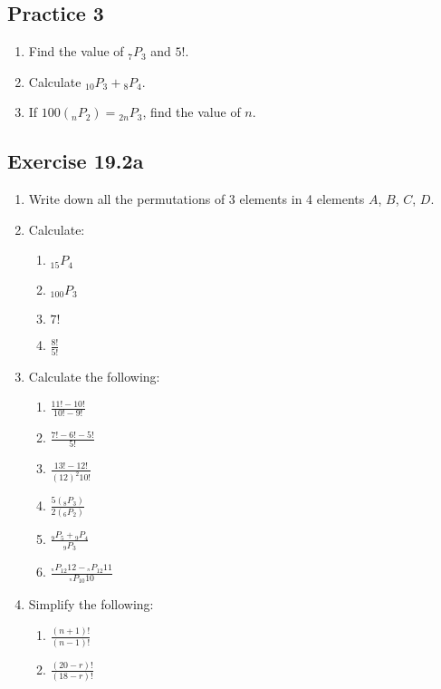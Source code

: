 \documentclass{report}
\newcommand\permtwo[2][^n]{{}_{#1}P_{#2}}
\begin{document}
\begin{multicols}{2}
  \subsection{Practice 3}

  \begin{enumerate}
    \item Find the value of $\permtwo[7]{3}$ and $5!$.
    \item Calculate $\permtwo[10]{3} + \permtwo[8]{4}$.
    \item If $100(\permtwo[n]{2}) = \permtwo[2n]{3}$, find the value of $n$.
  \end{enumerate}

  \subsection{Exercise 19.2a}

  \begin{enumerate}
    \item Write down all the permutations of 3 elements in 4 elements $A$, $B$, $C$, $D$.

    \item Calculate:
          \begin{enumerate}
            \item $\permtwo[15]{4}$
            \item $\permtwo[100]{3}$
            \item $7!$
            \item $\frac{8!}{5!}$
          \end{enumerate}

    \item Calculate the following:
          \begin{enumerate}
            \item $\frac{11! - 10!}{10! - 9!}$
            \item $\frac{7! - 6! - 5!}{5!}$
            \item $\frac{13! - 12!}{{(12)}^2 10!}$
            \item $\frac{5(\permtwo[8]{3})}{2(\permtwo[6]{2})}$
            \item $\frac{\permtwo[9]{5} + \permtwo[9]{4}}{\permtwo[9]{3}}$
            \item $\frac{\permtwo{12}{12} - \permtwo{12}{11}}{\permtwo{10}{10}}$
          \end{enumerate}

    \item Simplify the following:
          \begin{enumerate}
            \item $\frac{(n+1)!}{(n-1)!}$
            \item $\frac{(20 - r)!}{(18 - r)!}$
          \end{enumerate}


\end{enumerate}
\end{multicols}
\end{document}
